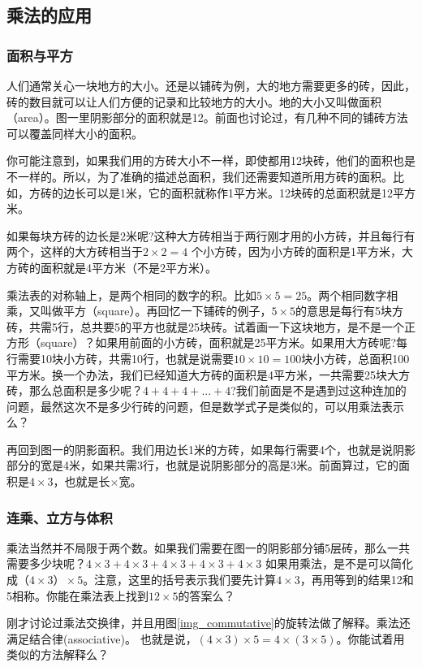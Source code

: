 \subsection{乘法的应用}
\subsubsection{面积与平方}
人们通常关心一块地方的大小。还是以铺砖为例，大的地方需要更多的砖，因此，砖的数目就可以让人们方便的记录和比较地方的大小。地的大小又叫做面积（area）。图一里阴影部分的面积就是12。前面也讨论过，有几种不同的铺砖方法可以覆盖同样大小的面积。

你可能注意到，如果我们用的方砖大小不一样，即使都用12块砖，他们的面积也是不一样的。所以，为了准确的描述总面积，我们还需要知道所用方砖的面积。比如，方砖的边长可以是1米，它的面积就称作1平方米。12块砖的总面积就是12平方米。

如果每块方砖的边长是2米呢?这种大方砖相当于两行刚才用的小方砖，并且每行有两个，这样的大方砖相当于$2\times2 = 4$ 个小方砖，因为小方砖的面积是1平方米，大方砖的面积就是4平方米（不是2平方米）。

乘法表的对称轴上，是两个相同的数字的积。比如$5\times5 = 25$。两个相同数字相乘，又叫做平方（square）。再回忆一下铺砖的例子，$5\times5$的意思是每行有5块方砖，共需5行，总共要5的平方也就是25块砖。试着画一下这块地方，是不是一个正方形（square）？如果用前面的小方砖，面积就是25平方米。如果用大方砖呢?每行需要10块小方砖，共需10行，也就是说需要$10\times10=100$块小方砖，总面积100平方米。换一个办法，我们已经知道大方砖的面积是4平方米，一共需要25块大方砖，那么总面积是多少呢？$4+4+4+...+4$?我们前面是不是遇到过这种连加的问题，最然这次不是多少行砖的问题，但是数学式子是类似的，可以用乘法表示么？

再回到图一的阴影面积。我们用边长1米的方砖，如果每行需要4个，也就是说阴影部分的宽是4米，如果共需3行，也就是说阴影部分的高是3米。前面算过，它的面积是$4\times3$，也就是长$\times$宽。

\subsubsection{连乘、立方与体积}

乘法当然并不局限于两个数。如果我们需要在图一的阴影部分铺5层砖，那么一共需要多少块呢？$4\times3 + 4\times3 + 4\times3 + 4\times3 + 4\times3$ 如果用乘法，是不是可以简化成$（4\times3）\times5$。注意，这里的括号表示我们要先计算$4\times3$，再用等到的结果12和5相称。你能在乘法表上找到$12\times5$的答案么？

刚才讨论过乘法交换律，并且用图\ref{img_commutative}的旋转法做了解释。乘法还满足结合律(associative)。 也就是说，$(4\times3)\times5 = 4\times(3\times5)$。你能试着用类似的方法解释么？


